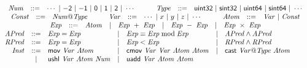 
\begin{figure*}
  \centering
  \begin{math}
    \begin{array}{rclclcl}
      \multicolumn{7}{c}{
      \begin{array}{rclcrcl}
        \mathit{Num} & ::= & \cdots \ |\ \mathsf{-2} \ |\ \mathsf{-1}
                             \ |\ \mathsf{0} \ |\ \mathsf{1} \ |\
                             \mathsf{2} \ |\  \cdots
        & \hspace{1em} &
        \mathit{Type} & ::= & \mathsf{uint32}\ |\ \mathsf{sint32}\ |\
                              \mathsf{uint64}\ |\ \mathsf{sint64}\ |\ \cdots
      \end{array}
      }\\
      \multicolumn{7}{c}{
      \begin{array}{rclcrclcrcl}
      \mathit{Const} & ::= & \mathit{Num}\mathsf{@}\mathit{Type}
      & \hspace{1em} &
      \mathit{Var} & ::= & \cdots\ |\ x \ |\ y \ |\ z \ |\ \cdots
      & \hspace{1em} &
      \mathit{Atom} & ::= & \mathit{Var} \ |\ \mathit{Const}
      \end{array}
      }
      \\
      \multicolumn{7}{c}{
      \begin{array}{rclclclcl}
        \mathit{Exp} & ::= & \mathit{Atom}
        & | & \mathit{Exp}\ +\ \mathit{Exp}
        & | & \mathit{Exp}\ -\ \mathit{Exp}
        & | & \mathit{Exp}\ \times\ \mathit{Exp}
      \end{array}
      }
      \\
      \mathit{APred} & ::= &
        \mathit{Exp} = \mathit{Exp}
      & | & \mathit{Exp} \equiv \mathit{Exp} \bmod \mathit{Exp}
      & | & \mathit{APred} \wedge \mathit{APred}
      \\
      \mathit{RPred} & ::= &
        \mathit{Exp} = \mathit{Exp}
      & | & \mathit{Exp} < \mathit{Exp}
      & | & \mathit{RPred} \wedge \mathit{RPred}
      \\
      \mathit{Inst} & ::= &
            \clMov\ \mathit{Var}\ \mathit{Atom}
      & | & \clCmov\ \mathit{Var}\ \mathit{Var}\
            \mathit{Atom}\ \mathit{Atom}
      & | & \clVPCast\ \mathit{Var}\mathsf{@}\mathit{Type}\ \mathit{Atom}\\
      & | & \clUShl\ \mathit{Var}\ \mathit{Atom}\ \mathit{Num}
      & | & \clUAdd\ \mathit{Var}\ \mathit{Atom}\ \mathit{Atom}

\end{array}
\end{math}
\end{figure*}
